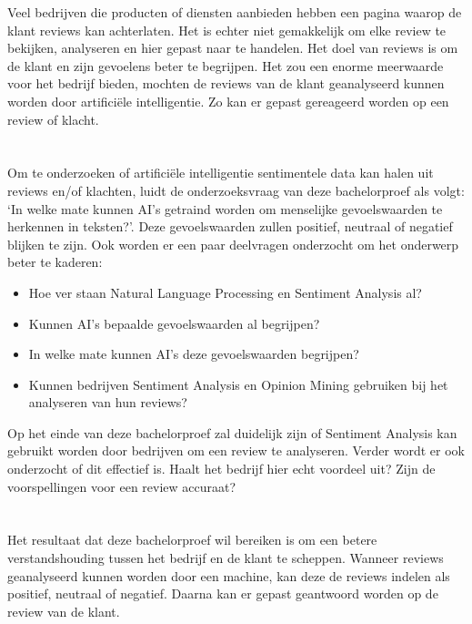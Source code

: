 Veel bedrijven die producten of diensten aanbieden hebben een pagina waarop de klant reviews kan achterlaten. Het is echter niet gemakkelijk om elke review te bekijken, analyseren en hier gepast naar te handelen. Het doel van reviews is om de klant en zijn gevoelens beter te begrijpen. Het zou een enorme meerwaarde voor het bedrijf bieden, mochten de reviews van de klant geanalyseerd kunnen worden door artificiële intelligentie. Zo kan er gepast gereageerd worden op een review of klacht. 

\section{}
\label{sec:onderzoeksvraag}

Om te onderzoeken of artificiële intelligentie sentimentele data kan halen uit reviews en/of klachten, luidt de onderzoeksvraag van deze bachelorproef als volgt: `In welke mate kunnen AI's getraind worden om menselijke gevoelswaarden te herkennen in teksten?'. Deze gevoelswaarden zullen positief, neutraal of negatief blijken te zijn. Ook worden er een paar deelvragen onderzocht om het onderwerp beter te kaderen:

\begin{itemize}
    \item Hoe ver staan Natural Language Processing en Sentiment Analysis al?
    \item Kunnen AI's bepaalde gevoelswaarden al begrijpen?
    \item In welke mate kunnen AI's deze gevoelswaarden begrijpen?
    \item Kunnen bedrijven Sentiment Analysis en Opinion Mining gebruiken bij het analyseren van hun reviews?
\end{itemize}

Op het einde van deze bachelorproef zal duidelijk zijn of Sentiment Analysis kan gebruikt worden door bedrijven om een review te analyseren. Verder wordt er ook onderzocht of dit effectief is. Haalt het bedrijf hier echt voordeel uit? Zijn de voorspellingen voor een review accuraat?


\section{}
\label{sec:onderzoeksdoelstelling}

Het resultaat dat deze bachelorproef wil bereiken is om een betere verstandshouding tussen het bedrijf en de klant te scheppen. Wanneer reviews geanalyseerd kunnen worden door een machine, kan deze de reviews indelen als positief, neutraal of negatief. Daarna kan er gepast geantwoord worden op de review van de klant. 

